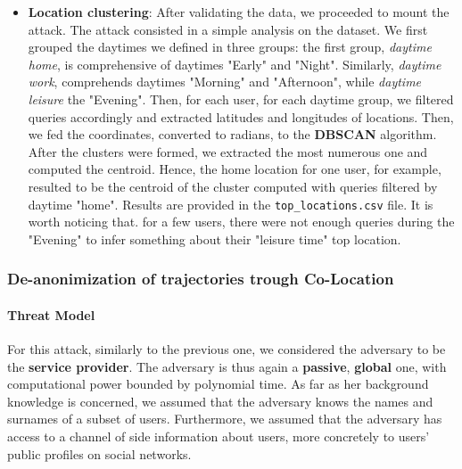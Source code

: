 \documentclass[10pt,conference,compsocconf]{IEEEtran}
\begin{document}
\begin{itemize}
    \item \textbf{Location clustering}: After validating the data, we proceeded
    to mount the attack. The attack consisted in a simple analysis on the
    dataset. We first grouped the daytimes we defined in three groups: the first
    group, \textit{daytime home}, is comprehensive of daytimes "Early" and
    "Night". Similarly, \textit{daytime work}, comprehends daytimes "Morning"
    and "Afternoon", while \textit{daytime leisure} the "Evening". Then, for
    each user, for each daytime group, we filtered queries accordingly and
    extracted latitudes and longitudes of locations. Then, we fed the
    coordinates, converted to radians, to the \textbf{DBSCAN} algorithm. After
    the clusters were formed, we extracted the most numerous one and computed
    the centroid. Hence, the home location for one user, for example, resulted
    to be the centroid of the cluster computed with queries filtered by daytime
    "home". Results are provided in the \texttt{top\_locations.csv} file. It is
    worth noticing that. for a few users, there were not enough queries during
    the "Evening" to infer something about their "leisure time" top location.
\end{itemize}

\subsubsection{De-anonimization of trajectories trough Co-Location}


\paragraph{Threat Model}
For this attack, similarly to the previous one, we considered the adversary to
be the \textbf{service provider}. The adversary is thus again a
\textbf{passive}, \textbf{global} one, with computational power bounded by
polynomial time.\newline
As far as her background knowledge is concerned, we assumed that the adversary
knows the names and surnames of a subset of users. Furthermore, we assumed that
the adversary has access to a channel of side information about users, more
concretely to users' public profiles on social networks.
\end{document}
